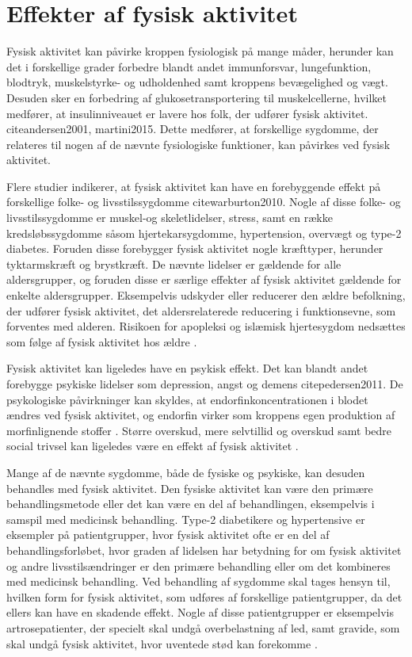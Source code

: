 \section{Effekter af fysisk aktivitet}
Fysisk aktivitet kan påvirke kroppen fysiologisk på mange måder, herunder kan det i forskellige grader forbedre blandt andet immunforsvar, lungefunktion, blodtryk, muskelstyrke- og udholdenhed samt kroppens bevægelighed og vægt. Desuden sker en forbedring af glukosetransportering til muskelcellerne, hvilket medfører, at insulinniveauet er lavere hos folk, der udfører fysisk aktivitet. cite{andersen2001, martini2015}. Dette medfører, at forskellige sygdomme, der relateres til nogen af de nævnte fysiologiske funktioner, kan påvirkes ved fysisk aktivitet.

Flere studier indikerer, at fysisk aktivitet kan have en forebyggende effekt på forskellige folke- og livsstilssygdomme cite{warburton2010}. Nogle af disse folke- og livsstilssygdomme er muskel-og skeletlidelser, stress, samt en række kredsløbssygdomme såsom hjertekarsygdomme, hypertension, overvægt og type-2 diabetes. Foruden disse forebygger fysisk aktivitet nogle kræfttyper, herunder tyktarmskræft og brystkræft. De nævnte lidelser er gældende for alle aldersgrupper, og foruden disse er særlige effekter af fysisk aktivitet gældende for enkelte aldersgrupper. Eksempelvis udskyder eller reducerer den ældre befolkning, der udfører fysisk aktivitet, det aldersrelaterede reducering i funktionsevne, som forventes med alderen. Risikoen for apopleksi og islæmisk hjertesygdom nedsættes som følge af fysisk aktivitet hos ældre \cite{pedersen2011,
warburton2010}. 

Fysisk aktivitet kan ligeledes have en psykisk effekt. Det kan blandt andet forebygge psykiske lidelser som depression, angst og demens cite{pedersen2011}. De psykologiske påvirkninger kan skyldes, at endorfinkoncentrationen i blodet ændres ved fysisk aktivitet, og endorfin virker som kroppens egen produktion af morfinlignende stoffer \cite{kessing2016}. Større overskud, mere selvtillid og overskud samt bedre social trivsel kan ligeledes være en effekt af fysisk aktivitet \cite{sundhedsstyrelsen2006}. 

Mange af de nævnte sygdomme, både de fysiske og psykiske, kan desuden behandles med fysisk aktivitet. Den fysiske aktivitet kan være den primære behandlingsmetode eller det kan være en del af behandlingen, eksempelvis i samspil med medicinsk behandling. Type-2 diabetikere og hypertensive er eksempler på patientgrupper, hvor fysisk aktivitet ofte er en del af behandlingsforløbet, hvor graden af lidelsen har betydning for om fysisk aktivitet og andre livsstilsændringer er den primære behandling eller om det kombineres med medicinsk behandling. Ved behandling af sygdomme skal tages hensyn til, hvilken form for fysisk aktivitet, som udføres af forskellige patientgrupper, da det ellers kan have en skadende effekt. Nogle af disse patientgrupper er eksempelvis artrosepatienter, der specielt skal undgå overbelastning af led, samt gravide, som skal undgå fysisk aktivitet, hvor uventede stød kan forekomme \cite{andersen2001, pedersen2011}.
